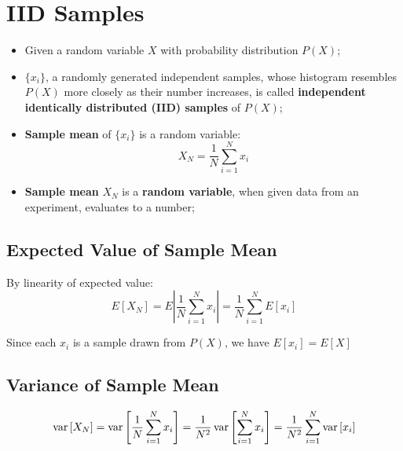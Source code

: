 \section{IID Samples}

  \begin{itemize}
    \item Given a random variable $ X $ with probability distribution $ P (X) $;
    \item $ \{ x_{i} \} $, a randomly generated independent samples, whose histogram resembles $ P(X) $ more closely as their number increases, is called \textbf{independent identically distributed (IID) samples} of $  P(X) $;
    \item \textbf{Sample mean} of $ \{ x_{i} \} $ is a random variable:
    \begin{displaymath}
      X_{N} = \frac{1}{N} \sum_{i = 1}^{N} x_{i}
    \end{displaymath}

    \item \textbf{Sample mean} $ X_{N} $ is a \textbf{random variable}, when given data from an experiment, evaluates to a number;
  \end{itemize}

  \subsection{Expected Value of Sample Mean}

    By linearity of expected value:
    \begin{equation}
      E \left[ X_{N} \right] = E \left| \frac{1}{N} \sum_{i = 1}^{N} x_{i} \right| = \frac{1}{N} \sum_{i = 1}^{N} E \left[ x_{i} \right]
    \end{equation}

    Since each $ x_{i} $ is a sample drawn from $ P \left( X \right) $, we have $ E \left[ x_{i} \right] = E \left[ X \right] $

  \subsection{Variance of Sample Mean}

    \begin{equation}
      \operatorname{var} \left[ X_{N} \right] = \operatorname{var} \left[ \frac{1}{N} \sum_{i = 1}^{N} x_{i} \right] = \frac{1}{ N^{2} } \operatorname{var} \left[ \sum_{i = 1}^{N} x_{i} \right] = \frac{1}{N^{2}} \sum_{i = 1}^{N} \operatorname{var} \left[ x_{i} \right]
    \end{equation}

